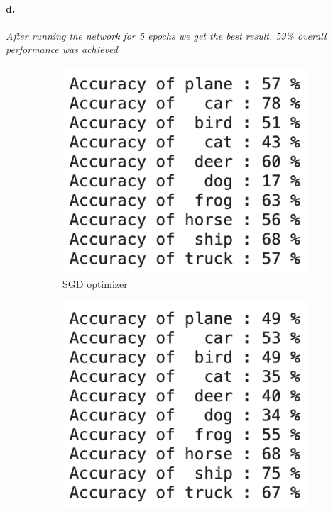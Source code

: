 \documentclass[a4 paper]{article}
\begin{document}
\paragraph{d.} \textit{After running the network for 5 epochs we get the best result. 59\% overall performance was achieved }
\begin{figure}[h!]
    \centering
    \begin{subfigure}{.244\textwidth}
      \centering
      \includegraphics[width=1\linewidth]{images/q9_5.png}
      \caption{SGD optimizer}
      \label{fig:sub1}
    \end{subfigure}%
    \begin{subfigure}{.244\textwidth}
      \centering
      \includegraphics[width=1\linewidth]{images/q9_6.png}

\end{subfigure}
\end{figure}
\end{document}
